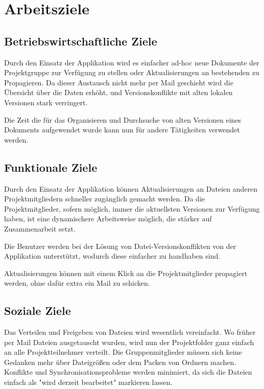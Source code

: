 
\section{Arbeitsziele}

\subsection{Betriebswirtschaftliche Ziele}

Durch den Einsatz der Applikation wird es einfacher ad-hoc neue Dokumente der Projektgruppe zur Verfügung zu stellen oder Aktualisierungen an bestehenden zu Propagieren. Da dieser Austausch nicht mehr per Mail geschieht wird die Übersicht über die Daten erhöht, und Versionskonflikte mit alten lokalen Versionen stark verringert.

Die Zeit die für das Organisieren und Durchsuche von alten Versionen eines Dokuments aufgewendet wurde kann nun für andere Tätigkeiten verwendet werden.

\subsection{Funktionale Ziele}

Durch den Einsatz der Applikation können Aktualisierungen an Dateien anderen Projektmitgliedern schneller zugänglich gemacht werden. Da die Projektmitglieder, sofern möglich, immer die aktuellsten Versionen zur Verfügung haben, ist eine dynamischere Arbeitsweise möglich, die stärker auf Zusammenarbeit setzt.

Die Benutzer werden bei der Lösung von Datei-Versionskonflikten von der Applikation unterstützt, wodurch diese einfacher zu handhaben sind.

Aktualisierungen können mit einem Klick an die Projektmitglieder propagiert werden, ohne dafür extra ein Mail zu schicken.

\subsection{Soziale Ziele}
Das Verteilen und Freigeben von Dateien wird wesentlich vereinfacht. Wo früher per Mail Dateien ausgetauscht wurden, wird nun der Projektfolder ganz einfach an alle Projektteilnehmer verteilt. Die Gruppenmitglieder müssen sich keine Gedanken mehr über Dateigrößen oder dem Packen von Ordnern machen. Konflikte und Synchronisationsprobleme werden minimiert, da sich die Dateien einfach als "wird derzeit bearbeitet" markieren lassen.

